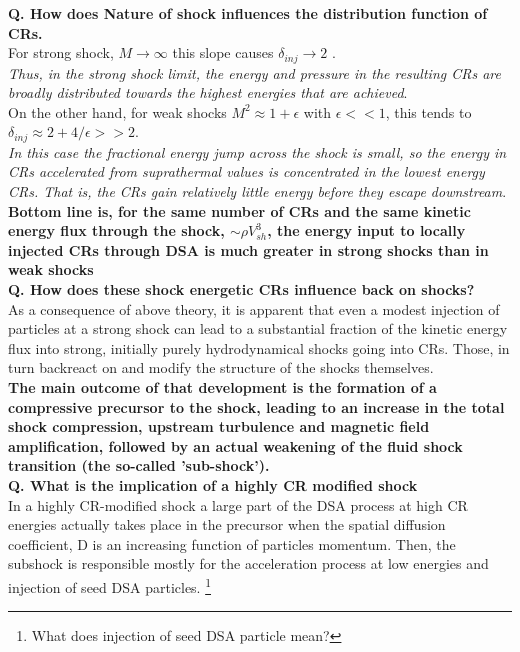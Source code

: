 \documentclass[11pt]{report}
\newcommand{\tbf}[1]{\textbf{#1}}
\newcommand{\tit}[1]{\textit{#1}}
\newcommand{\fn}[1]{\footnote{#1}}
\begin{document}
\tbf{Q. How does Nature of shock influences the distribution function of CRs.}\\

For strong shock, $M\rightarrow \infty $ this slope causes $\delta_{inj} \rightarrow 2$ .\\
\tit{Thus, in the strong shock limit, the energy and pressure in the resulting CRs are broadly distributed towards the highest energies that are achieved}.\\

On the other hand, for weak shocks $M^2\approx 1+\epsilon$ with $\epsilon<<1$, this tends to $\delta_{inj}\approx 2+4/\epsilon>>2$. \\
\tit{In this case the fractional energy jump across the shock is small, so the energy in CRs accelerated from suprathermal values is concentrated in the lowest energy CRs. That is, the CRs gain relatively little energy before they escape downstream}. \\

\tbf{Bottom line is, for the same number of CRs and the same kinetic energy flux through the shock, $\sim \rho V^3_{sh}$, the energy input to locally injected CRs through DSA is much greater in strong shocks than in weak shocks}\\

\tbf{Q. How does these shock energetic CRs influence back on shocks?}\\

As a consequence of above theory, it is apparent that even a modest injection of particles at a strong shock can lead to a substantial fraction of the kinetic energy flux into strong, initially purely hydrodynamical shocks going into CRs. Those, in turn backreact on and modify the structure of the shocks themselves.\\
\tbf{ The main outcome of that development is the formation of a compressive precursor to the shock, leading to an increase in the total shock compression, upstream turbulence and magnetic field amplification, followed by an actual weakening of the fluid shock transition (the so-called 'sub-shock'). }\\

\tbf{Q. What is the implication of a highly CR modified shock}\\
In a highly CR-modified shock a large part of the DSA process at high CR energies actually takes place in the precursor when the spatial diffusion coefficient, D is an increasing function of particles momentum. Then, the subshock is responsible mostly for the acceleration process at low energies and injection of seed DSA particles. \fn{What does injection of seed DSA particle mean?}\\
\end{document}
